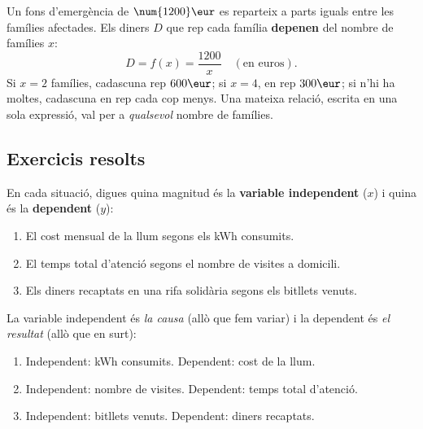 \begin{exemple}
Un fons d'emergència de $\num{1200}\eur$ es reparteix a parts iguals entre les
famílies afectades. Els diners $D$ que rep cada família \textbf{depenen} del nombre
de famílies $x$:
\[
D = f(x) = \frac{\num{1200}}{x} \quad(\text{en euros}).
\]
Si $x=2$ famílies, cadascuna rep $600\eur$; si $x=4$, en rep $300\eur$; si n'hi ha
moltes, cadascuna en rep cada cop menys. Una mateixa relació, escrita en una sola
expressió, val per a \emph{qualsevol} nombre de famílies.
\end{exemple}

\subsection{Exercicis resolts}

\begin{exresolt}
En cada situació, digues quina magnitud és la \textbf{variable independent} ($x$) i
quina és la \textbf{dependent} ($y$):
\begin{enumerate}[label=\alph*), leftmargin=1.6em]
  \item El cost mensual de la llum segons els kWh consumits.
  \item El temps total d'atenció segons el nombre de visites a domicili.
  \item Els diners recaptats en una rifa solidària segons els bitllets venuts.
\end{enumerate}
\solucio
La variable independent és \emph{la causa} (allò que fem variar) i la dependent és
\emph{el resultat} (allò que en surt):
\begin{enumerate}[label=\alph*), leftmargin=1.6em]
  \item Independent: kWh consumits. Dependent: cost de la llum.
  \item Independent: nombre de visites. Dependent: temps total d'atenció.
  \item Independent: bitllets venuts. Dependent: diners recaptats.
\end{enumerate}
\end{exresolt}

